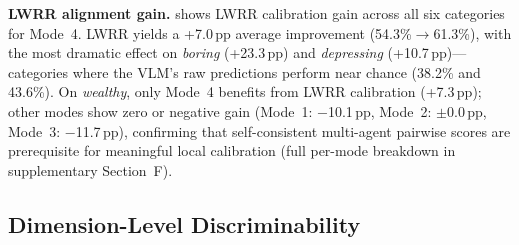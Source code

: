 \documentclass[runningheads]{llncs}
\begin{document}
\smallskip\noindent\textbf{LWRR alignment gain.}
 shows LWRR calibration gain across all six categories for Mode~4.
LWRR yields a +7.0\,pp average improvement (54.3\%$\to$61.3\%), with the most dramatic effect on \emph{boring} (+23.3\,pp) and \emph{depressing} (+10.7\,pp)---categories where the VLM's raw predictions perform near chance (38.2\% and 43.6\%).
On \emph{wealthy}, only Mode~4 benefits from LWRR calibration (+7.3\,pp); other modes show zero or negative gain (Mode~1: $-$10.1\,pp, Mode~2: $\pm$0.0\,pp, Mode~3: $-$11.7\,pp), confirming that self-consistent multi-agent pairwise scores are prerequisite for meaningful local calibration (full per-mode breakdown in supplementary Section~F).

\subsection{Dimension-Level Discriminability}
\end{document}
